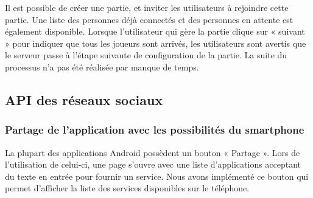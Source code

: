 \documentclass{report}
\begin{document}
Il est possible de créer une partie, et inviter les utilisateurs à
rejoindre cette partie. Une liste des personnes déjà connectés et des
personnes en attente est également disponible. Lorsque l’utilisateur qui
gère la partie clique sur « suivant » pour indiquer que tous les joueurs
sont arrivés, les utilisateurs sont avertis que le serveur passe à
l’étape suivante de configuration de la partie. La suite du processus
n’a pas été réalisée par manque de temps.

\subsection{API des réseaux sociaux}
\bigskip


\subsubsection{Partage de l’application avec les possibilités du smartphone}

La plupart des applications Android possèdent un bouton « Partage ».
Lors de l’utilisation de celui-ci, une page s’ouvre avec une liste
d’applications acceptant du texte en entrée pour fournir un service.
Nous avons implémenté ce bouton qui permet d’afficher la liste des
services disponibles sur le téléphone.
\bigskip
\end{document}
